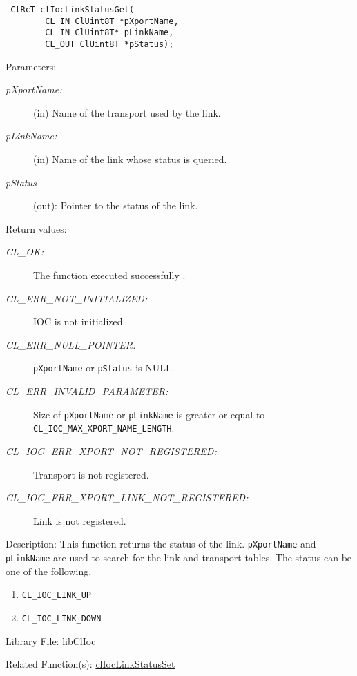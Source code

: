 \begin{flushleft}
\begin{Desc}
\footnotesize\begin{verbatim} ClRcT clIocLinkStatusGet(
        CL_IN ClUint8T *pXportName,
        CL_IN ClUint8T* pLinkName,
        CL_OUT ClUint8T *pStatus);
\end{verbatim}
\normalsize
\end{Desc}
\begin{Desc}
\item[Parameters:]
\begin{description}
\item[{\em p\-Xport\-Name:}](in) Name of the transport used by the link. \item[{\em p\-Link\-Name:}](in) Name of the link whose status is queried. 
\item[{\em p\-Status}](out): Pointer to the status of the link.\end{description}
\end{Desc}
\begin{Desc}
\item[Return values:]
\begin{description}
\item[{\em CL\_\-OK:}]The function executed successfully . \item[{\em CL\_\-ERR\_\-NOT\_\-INITIALIZED:}] IOC is not initialized. 
\item[{\em CL\_\-ERR\_\-NULL\_\-POINTER:}]{\tt{pXportName}} or {\tt{pStatus}} is NULL.
\item[{\em CL\_\-ERR\_\-INVALID\_\-PARAMETER:}]Size of {\tt{p\-Xport\-Name}} or {\tt{p\-Link\-Name}} is greater or equal to 
{\tt{CL\_\-IOC\_\-MAX\_\-XPORT\_\-NAME\_\-LENGTH}}. 
\item[{\em CL\_\-IOC\_\-ERR\_\-XPORT\_\-NOT\_\-REGISTERED:}]Transport is not registered. 
\item[{\em CL\_\-IOC\_\-ERR\_\-XPORT\_\-LINK\_\-NOT\_\-REGISTERED:}]Link is not registered.\end{description}
\end{Desc}
\begin{Desc}
\item[Description:]This function returns the status of the link. {\tt{p\-Xport\-Name}} and {\tt{p\-Link\-Name}} are used to search for the link and 
transport tables. The status can be one of the following,\begin{enumerate}
\item {\tt{CL\_\-IOC\_\-LINK\_\-UP}} \item {\tt{CL\_\-IOC\_\-LINK\_\-DOWN}} \end{enumerate}
\end{Desc}
\begin{Desc}
\item[Library File:]libClIoc\end{Desc}
\begin{Desc}
\item[Related Function(s):]\hyperlink{pageioc212}{cl\-Ioc\-Link\-Status\-Set} \end{Desc}
\newpage



\end{flushleft}
